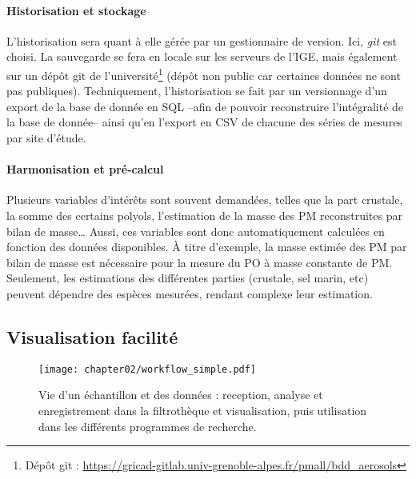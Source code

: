 \paragraph{Historisation et stockage}%
\label{par:historisation_et_stockage}

L'historisation sera quant à elle gérée par un gestionnaire de version. Ici, \textit{git}
est choisi. La sauvegarde se fera en locale sur les serveurs de l'IGE, mais également sur
un dépôt git de l'université\footnote{Dépôt git :
\url{https://gricad-gitlab.univ-grenoble-alpes.fr/pmall/bdd_aerosols}} (dépôt non public
car certaines données ne sont pas publiques).
Techniquement, l'historisation se fait par un versionnage d'un export de la base de donnée en
SQL --afin de pouvoir reconstruire l'intégralité de la base de donnée-- ainsi qu'en
l'export en CSV de chacune des séries de mesures par site d'étude.

\paragraph{Harmonisation et pré-calcul}%
\label{par:harmonisation_et_pré_calcul}

Plusieurs variables d'intérêts sont souvent demandées, telles que la part crustale, la
somme des certains polyols, l'estimation de la masse des PM reconstruites par bilan de
masse… Aussi, ces variables sont donc automatiquement calculées en fonction des données
disponibles. À titre d'exemple, la masse estimée des PM par bilan de masse est nécessaire
pour la mesure du PO à masse constante de PM. Seulement, les estimations des différentes
parties (crustale, sel marin, etc) peuvent dépendre des espèces mesurées, rendant complexe
leur estimation.

\subsection{Visualisation facilité}%
\label{sub:visualisation_facilité}




\begin{landscape}
\begin{figure}[ht]
    \centering
    \texttt{[image: chapter02/workflow\_simple.pdf]}
    \caption{Vie d'un échantillon et des données : reception, analyse et enregistrement
        dans la filtrothèque et visualisation, puis utilisation dans les différents
        programmes de recherche.}%
    \label{fig:bdd}
\end{figure}
\end{landscape}

